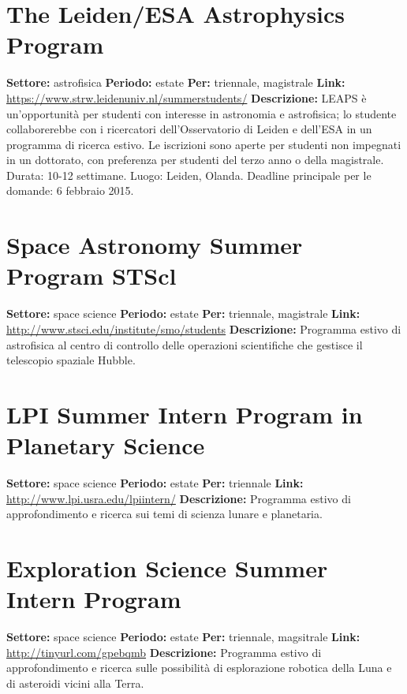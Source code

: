 \documentclass[a4paper,10pt]{article}
\begin{document}
\section{The Leiden/ESA Astrophysics Program}
\textbf{Settore:} astrofisica\newline
\textbf{Periodo:} estate \newline
\textbf{Per:} triennale, magistrale\newline
\textbf{Link:} \url{https://www.strw.leidenuniv.nl/summerstudents/} \newline
\textbf{Descrizione:} LEAPS è un’opportunità per studenti con interesse in astronomia e astrofisica; lo studente collaborerebbe con i ricercatori dell'Osservatorio di Leiden e dell’ESA in un programma di ricerca estivo. Le iscrizioni sono aperte per studenti non impegnati in un dottorato, con preferenza per studenti del terzo anno o della magistrale. Durata: 10-12 settimane. Luogo: Leiden, Olanda. Deadline principale per le domande: 6 febbraio 2015.

\section{Space Astronomy Summer Program STScl}
\textbf{Settore:} space science\newline
\textbf{Periodo:} estate\newline
\textbf{Per:} triennale, magistrale\newline
\textbf{Link:} \url{http://www.stsci.edu/institute/smo/students} \newline
\textbf{Descrizione:} Programma estivo di astrofisica al centro di controllo delle operazioni scientifiche che gestisce il telescopio spaziale Hubble.  

\section{LPI Summer Intern Program in Planetary Science}
\textbf{Settore:} space science\newline
\textbf{Periodo:} estate\newline
\textbf{Per:} triennale\newline
\textbf{Link:} \url{http://www.lpi.usra.edu/lpiintern/} \newline
\textbf{Descrizione:}  Programma estivo di approfondimento e ricerca sui temi di scienza lunare e planetaria. 

\section{Exploration Science Summer Intern Program}
\textbf{Settore:} space science\newline
\textbf{Periodo:} estate \newline
\textbf{Per:} triennale, magsitrale\newline
\textbf{Link:} \url{http://tinyurl.com/gpebqmb} \newline
\textbf{Descrizione:} Programma estivo di approfondimento e ricerca sulle possibilità di esplorazione robotica della Luna e di asteroidi vicini alla Terra. 
\end{document}
